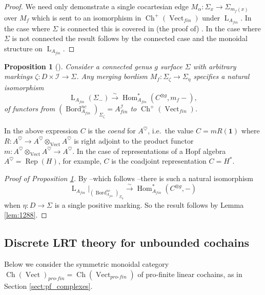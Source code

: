 \documentclass[reqno]{amsart}
\newtheorem{proposition}[lemma]{Proposition}
\theoremstyle{definition}
\newcommand{\mcl}[1]{\mathcal{#1}}
\newcommand{\opn}[1]{\operatorname{#1}}
\newcommand{\ot}{\otimes}
\newcommand{\dL}{\operatorname{L}}
\newcommand{\pf}{pro\text{-}fin}
\DeclareMathOperator{\Hom}{Hom}
\DeclareMathOperator{\Bord}{Bord}
\renewcommand{\1}{\mathbf{1}}
\begin{document}
\begin{proof}
We need only demonstrate a single cocartesian edge $M_{\alpha}:\Sigma_x\to \Sigma_{m_f(x)}$ over $M_f$ which is sent to an isomorphism in $\opn{Ch}^+(\opn{Vect}_{fin})$ under $\dL_{A_{fin}}$.  In the case where $\Sigma$ is connected this is covered in (the proof of) \cite[Lemma 8.4]{czenkynegron}.  In the case where $\Sigma$ is not connected the result follows by the connected case and the monoidal structure on $\dL_{A_{fin}}$.
\end{proof}

\begin{proposition}[{\cite{derenzietal23,czenkynegron}}]\label{prop:pre_states}
Consider a connected genus $g$ surface $\Sigma$ with arbitrary markings $\zeta:D\times \mcl{I}\to\Sigma$.  Any merging bordism $M_{f}:\Sigma_{\zeta}\to \Sigma_{\eta}$ specifies a natural isomorphism
\[
\dL_{A_{fin}}(\Sigma_-)\overset{\sim}\to \Hom^{\ast}_{A_{fin}}\left(C^{\ot g},m_f-\right),
\]
of functors from $(\Bord^{nc}_{A_{fin}})_{\Sigma_{\zeta}}=A_{fin}^{\mcl{I}}$ to $\opn{Ch}^+(\opn{Vect}_{fin})$.
\end{proposition}

In the above expression $C$ is the \emph{coend} for $A^{\heartsuit}$, i.e.\ the value $C=mR(\1)$ where $R:A^{\heartsuit}\to A^{\heartsuit}\ot_{\opn{Vect}} A^{\heartsuit}$ is right adjoint to the product functor $m:A^{\heartsuit}\ot_{\opn{Vect}}A^{\heartsuit}\to A^{\heartsuit}$.  In the case of representations of a Hopf algebra $A^{\heartsuit}=\opn{Rep}(H)$, for example, $C$ is the coadjoint representation $C=H^{\ast}$.

\begin{proof}[Proof of Proposition \ref{prop:pre_states}]
By \cite[Theorem 8.5]{czenkynegron}--which follows \cite[Proposition 4.17]{derenzietal23}--there is such a natural isomorphism
\[
\dL_{A_{fin}}|_{(\Bord_{A_{fin}}^{nc})_{\Sigma_{\eta}}}\overset{\sim}\to \Hom^{\ast}_{A_{fin}}(C^{\ot g},-)
\]
when $\eta:D\to \Sigma$ is a single positive marking.  So the result follows by Lemma \ref{lem:1288}.
\end{proof}

\subsection{Discrete LRT theory for unbounded cochains}

Below we consider the symmetric monoidal category $\opn{Ch}(\opn{Vect})_{\pf}=\opn{Ch}(\opn{Vect}_{\pf})$ of pro-finite linear cochains, as in Section \ref{sect:pf_complexes}.
\end{document}
